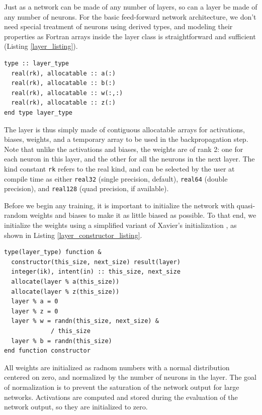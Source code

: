 \documentclass[sigplan, review=false, screen=true, balance=true]{acmart}
\begin{document}
Just as a network can be made of any number of layers, so can a layer be made
of any number of neurons. For the basic feed-forward network architecture,
we don't need special treatment of neurons using derived types, and modeling
their properties as Fortran arrays inside the layer class is straightforward
and sufficient (Listing \ref{layer_listing}).

\begin{lstlisting}[caption={Definition of the layer class.}, captionpos=b, label={layer_listing}]
type :: layer_type
  real(rk), allocatable :: a(:)
  real(rk), allocatable :: b(:)
  real(rk), allocatable :: w(:,:)
  real(rk), allocatable :: z(:)
end type layer_type
\end{lstlisting}

The layer is thus simply made of contiguous allocatable arrays for activations,
biases, weights, and a temporary array to be used in the backpropagation step.
Note that unlike the activations and biases, the weights are of rank 2: one for
each neuron in this layer, and the other for all the neurons in the next layer.
The kind constant \lstinline{rk} refers to the real kind, and can be selected
by the user at compile time as either \lstinline{real32} (single precision,
default), \lstinline{real64} (double precision), and \lstinline{real128}
(quad precision, if available).

Before we begin any training, it is important to initialize the network with
quasi-random weights and biases to make it as little biased as possible.
To that end, we initialize the weights using a simplified variant of Xavier's
initialization \citep{glorot10}, as shown in Listing \ref{layer_constructor_listing}.

\begin{lstlisting}[caption={Layer constructor.}, captionpos=b, label={layer_constructor_listing}]
type(layer_type) function &
  constructor(this_size, next_size) result(layer)
  integer(ik), intent(in) :: this_size, next_size
  allocate(layer % a(this_size))
  allocate(layer % z(this_size))
  layer % a = 0
  layer % z = 0
  layer % w = randn(this_size, next_size) &
             / this_size
  layer % b = randn(this_size)
end function constructor
\end{lstlisting}

All weights are initialized as radnom numbers with a normal distribution
centered on zero, and normalized by the number of neurons in the layer. The
goal of normalization is to prevent the saturation of the network output
for large networks.
Activations are computed and stored during the evaluation of the network output,
so they are initialized to zero.
\end{document}
